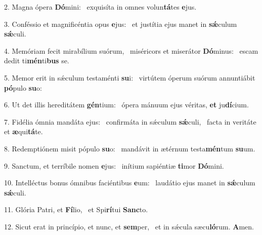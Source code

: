 2. Magna ópera \textbf{Dó}mini: \ast\  exquisíta in omnes volun\textbf{tá}tes \textbf{e}jus.\

3. Conféssio et magnificéntia opus \textbf{e}jus: \ast\  et justítia ejus manet in \textbf{sǽ}culum \textbf{sǽ}culi.\

4. Memóriam fecit mirabílium suórum, \dag\  miséricors et miserátor \textbf{Dó}minus: \ast\  escam dedit ti\textbf{mén}ti\textbf{bus} se.\

5. Memor erit in sǽculum testaménti \textbf{su}i: \ast\  virtútem óperum suórum annuntiábit \textbf{pó}pulo \textbf{su}o:\

6. Ut det illis hereditátem \textbf{gén}tium: \ast\  ópera mánuum ejus véritas, \textbf{et} ju\textbf{dí}cium.\

7. Fidélia ómnia mandáta ejus: \dag\  confirmáta in sǽculum \textbf{sǽ}culi, \ast\  facta in veritáte et \textbf{æ}qui\textbf{tá}te.\

8. Redemptiónem misit pópulo \textbf{su}o: \ast\  mandávit in ætérnum testa\textbf{mén}tum \textbf{su}um.\

9. Sanctum, et terríbile nomen \textbf{e}jus: \ast\  inítium sapiéntiæ \textbf{ti}mor \textbf{Dó}mini.\

10. Intelléctus bonus ómnibus faciéntibus \textbf{e}um: \ast\  laudátio ejus manet in \textbf{sǽ}culum \textbf{sǽ}culi.\

11. Glória Patri, et \textbf{Fí}lio, \ast\  et Spi\textbf{rí}tui \textbf{Sanc}to.\

12. Sicut erat in princípio, et nunc, et \textbf{sem}per, \ast\  et in sǽcula sæcu\textbf{ló}rum. \textbf{A}men.\

